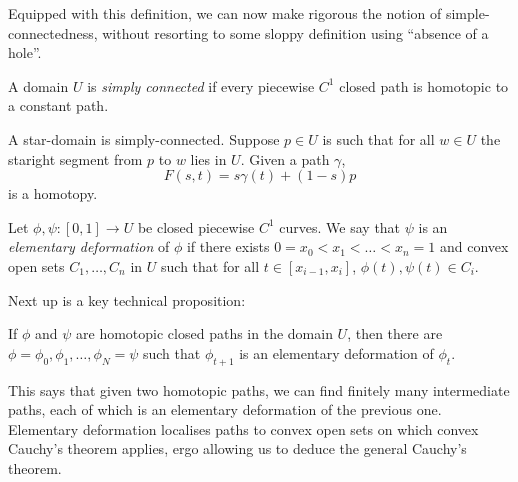 \documentclass[a4paper]{article}
\begin{document}
Equipped with this definition, we can now make rigorous the notion of simple-connectedness, without resorting to some sloppy definition using ``absence of a hole''.

\begin{definition}
  A domain \(U\) is \emph{simply connected} if every piecewise \(C^1\) closed path is homotopic to a constant path.
\end{definition}

\begin{eg}
  A star-domain is simply-connected. Suppose \(p \in U\) is such that for all \(w \in U\) the staright segment from \(p\) to \(w\) lies in \(U\). Given a path \(\gamma\),
  \[
    F(s, t) = s \gamma(t) + (1 - s)p
  \]
  is a homotopy.
\end{eg}

\begin{definition}
  Let \(\phi, \psi: [0, 1] \to U\) be closed piecewise \(C^1\) curves. We say that \(\psi\) is an \emph{elementary deformation} of \(\phi\) if there exists \(0 = x_0 < x_1 < \dots < x_n = 1\) and convex open sets \(C_1, \dots, C_n\) in \(U\) such that for all \(t \in [x_{i - 1}, x_i]\), \(\phi(t), \psi(t) \in C_i\).
\end{definition}

Next up is a key technical proposition:

\begin{proposition}
  If \(\phi\) and \(\psi\) are homotopic closed paths in the domain \(U\), then there are \(\phi = \phi_0, \phi_1, \dots, \phi_N = \psi\) such that \(\phi_{t + 1}\) is an elementary deformation of \(\phi_t\).
\end{proposition}

This says that given two homotopic paths, we can find finitely many intermediate paths, each of which is an elementary deformation of the previous one. Elementary deformation localises paths to convex open sets on which convex Cauchy's theorem applies, ergo allowing us to deduce the general Cauchy's theorem.
\end{document}
